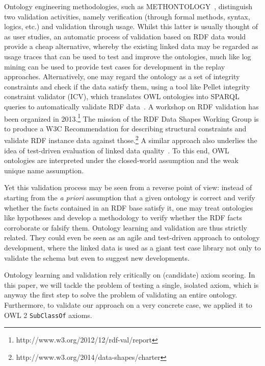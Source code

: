 \documentclass[conference]{IEEEtran}
\begin{document}
Ontology engineering methodologies, such as METHONTOLOGY~\cite{FernandezGomezJuristo1997},
distinguish two validation activities, namely verification (through formal methods, syntax, logics, etc.)
and validation through usage. Whilst this latter is usually thought of as user studies,
an automatic process of validation based on RDF data would provide a cheap alternative,
whereby the existing linked data may be regarded as usage traces that can be used
to test and improve the ontologies, much like log mining can be used to provide
test cases for development in the replay approaches.
Alternatively, one may regard the ontology as a set of integrity constraints and check if the
data satisfy them, using a tool like Pellet integrity constraint validator (ICV),
which translates OWL ontologies into SPARQL queries to automatically validate RDF data~\cite{SirinTao2009}. 
A workshop on RDF validation has been organized in 2013.\footnote{http://www.w3.org/2012/12/rdf-val/report}
The mission of the RDF Data Shapes Working Group is to produce a W3C Recommendation for describing structural constraints and validate RDF instance data against those.\footnote{http://www.w3.org/2014/data-shapes/charter}
A similar approach also underlies the idea of test-driven evaluation of linked data 
quality~\cite{KontokostasWestphalAuerHellmannLehmannCornelissen2014}.
To this end, OWL ontologies are interpreted under the closed-world assumption and
the weak unique name assumption. 


Yet this validation process may be seen from a reverse point of view:
instead of starting from the \emph{a priori} assumption that a given ontology
is correct and verify whether the facts contained in an RDF base satisfy it,
one may treat ontologies like hypotheses and develop a methodology to verify
whether the RDF facts corroborate or falsify them. Ontology learning and validation
are thus strictly related.
They could even be seen as an agile and test-driven approach to ontology development,
where the linked data is used as a giant test case library not only to validate the
schema but even to suggest new developments.

Ontology learning and validation rely critically on (candidate) axiom scoring.
In this paper, we will tackle the problem of testing a single, isolated axiom,
which is anyway the first step to solve the problem of validating an entire ontology.
Furthermore, to validate our approach on a very concrete case, we applied it
to OWL 2 \texttt{SubClassOf} axioms.
\end{document}
